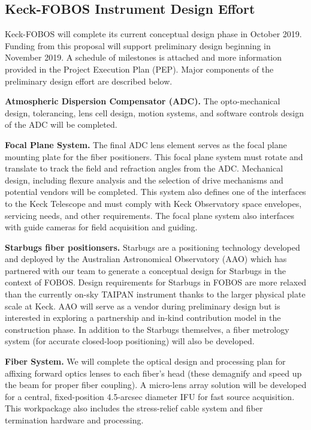 \documentclass[oneside,11pt]{amsart}
\newcommand{\comment}[2][todo]{{\color{#1}[[{\bf #2}]]}}
\begin{document}
\subsection{Keck-FOBOS Instrument Design Effort}
\label{sec:design}

Keck-FOBOS will complete its current conceptual design phase in October 2019.  Funding from this proposal will support preliminary design beginning in November 2019.  A schedule of milestones is attached and more information provided in the Project Execution Plan (PEP).  Major components of the preliminary design effort are described below.

\noindent \textbf{Atmospheric Dispersion Compensator (ADC).} The opto-mechanical design, tolerancing, lens cell design, motion systems, and software controls design of the ADC will be completed.  

\noindent \textbf{Focal Plane System.} The final ADC lens element serves as the focal plane mounting plate for the fiber positioners.  This focal plane system must rotate and translate to track the field and refraction angles from the ADC.  Mechanical design, including flexure analysis and the selection of drive mechanisms and potential vendors will be completed.  This system also defines one of the interfaces to the Keck Telescope and must comply with Keck Observatory space envelopes, servicing needs, and other requirements.  The focal plane system also interfaces with guide cameras for field acquisition and guiding.

\noindent \textbf{Starbugs fiber positionsers.} Starbugs are a positioning technology developed and deployed by the
Australian Astronomical Observatory (AAO) which has partnered with our team to generate a conceptual design for
Starbugs in the context of FOBOS.  Design requirements for Starbugs in FOBOS are more relaxed than the currently on-sky
TAIPAN instrument thanks to the larger physical plate scale at Keck.  AAO will serve as a vendor during preliminary
design but is interested in exploring a partnership and in-kind contribution model in the construction phase.  In addition to the Starbugs themselves, a fiber metrology system (for accurate closed-loop positioning) will also be developed.

\noindent \textbf{Fiber System.} We will complete the optical design and processing plan for affixing forward optics
lenses to each fiber's head (these demagnify and speed up the beam for proper fiber coupling).  A micro-lens array
solution will be developed for a central, fixed-position 4.5-arcsec diameter IFU for fast source acquisition. This
workpackage also includes the stress-relief cable system and fiber termination hardware and processing.
\end{document}
